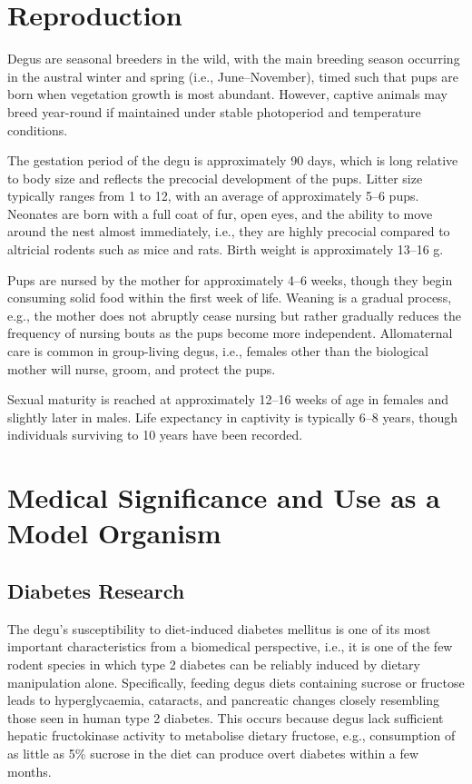 \documentclass[12pt,a4paper]{article}
\begin{document}
\section{Reproduction}

Degus are seasonal breeders in the wild, with the main breeding season occurring in the austral winter and spring (i.e., June--November), timed such that pups are born when vegetation growth is most abundant.
However, captive animals may breed year-round if maintained under stable photoperiod and temperature conditions.

The gestation period of the degu is approximately 90 days, which is long relative to body size and reflects the precocial development of the pups.
Litter size typically ranges from 1 to 12, with an average of approximately 5--6 pups.
Neonates are born with a full coat of fur, open eyes, and the ability to move around the nest almost immediately, i.e., they are highly precocial compared to altricial rodents such as mice and rats.
Birth weight is approximately 13--16 g.

Pups are nursed by the mother for approximately 4--6 weeks, though they begin consuming solid food within the first week of life.
Weaning is a gradual process, e.g., the mother does not abruptly cease nursing but rather gradually reduces the frequency of nursing bouts as the pups become more independent.
Allomaternal care is common in group-living degus, i.e., females other than the biological mother will nurse, groom, and protect the pups.

Sexual maturity is reached at approximately 12--16 weeks of age in females and slightly later in males.
Life expectancy in captivity is typically 6--8 years, though individuals surviving to 10 years have been recorded.

\section{Medical Significance and Use as a Model Organism}

\subsection{Diabetes Research}

The degu's susceptibility to diet-induced diabetes mellitus is one of its most important characteristics from a biomedical perspective, i.e., it is one of the few rodent species in which type 2 diabetes can be reliably induced by dietary manipulation alone.
Specifically, feeding degus diets containing sucrose or fructose leads to hyperglycaemia, cataracts, and pancreatic changes closely resembling those seen in human type 2 diabetes.
This occurs because degus lack sufficient hepatic fructokinase activity to metabolise dietary fructose, e.g., consumption of as little as 5\% sucrose in the diet can produce overt diabetes within a few months.
\end{document}
